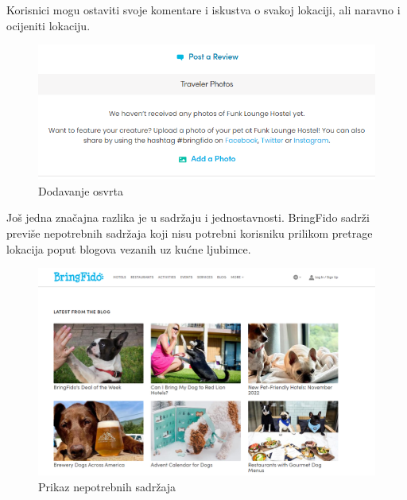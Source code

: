 Korisnici mogu ostaviti svoje komentare i iskustva o svakoj lokaciji, ali naravno i ocijeniti lokaciju. 
\begin{figure}[H]
	\includegraphics[scale=0.4]{slike/BringFidoAddReview.png}
	\centering
	\caption{Dodavanje osvrta}
	\label{fig:promjene}
\end{figure}
Još jedna značajna razlika je u sadržaju i jednostavnosti. BringFido sadrži previše nepotrebnih sadržaja koji nisu potrebni korisniku prilikom pretrage lokacija poput blogova vezanih uz kućne ljubimce.
\begin{figure}[H]
	\includegraphics[scale=0.4]{slike/Nepotrebno.png}
	\centering
	\caption{Prikaz nepotrebnih sadržaja}
	\label{fig:promjene}
\end{figure}

\eject
		
	